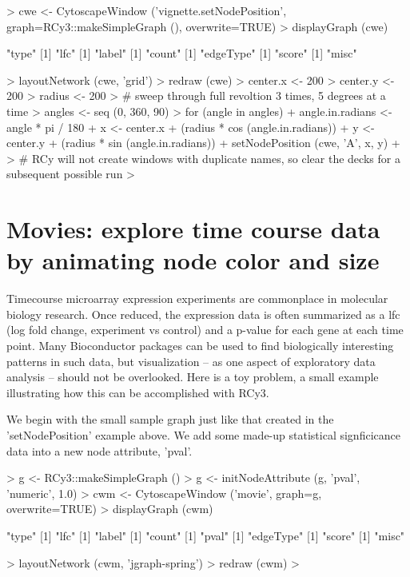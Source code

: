 \documentclass[12pt]{article}
\begin{document}
\begin{Schunk}
\begin{Sinput}
>   cwe <- CytoscapeWindow ('vignette.setNodePosition', graph=RCy3::makeSimpleGraph (), overwrite=TRUE)
>   displayGraph (cwe)
\end{Sinput}
\begin{Soutput}
[1] "type"
[1] "lfc"
[1] "label"
[1] "count"
[1] "edgeType"
[1] "score"
[1] "misc"
\end{Soutput}
\begin{Sinput}
>   layoutNetwork (cwe, 'grid')
>   redraw (cwe)
>   center.x <- 200
>   center.y <- 200
>   radius <- 200
>     # sweep through full revoltion 3 times, 5 degrees at a time
>   angles <- seq (0, 360, 90)
>   for (angle in angles) {
+     angle.in.radians <- angle * pi / 180
+     x <- center.x + (radius * cos (angle.in.radians))
+     y <- center.y + (radius * sin (angle.in.radians))
+     setNodePosition (cwe, 'A', x, y)
+     }
>     # RCy will not create windows with duplicate names, so clear the decks for a subsequent possible run
> 
\end{Sinput}
\end{Schunk}

\section{Movies:  explore time course data by animating node color and size}

Timecourse microarray expression experiments are commonplace in molecular biology research.  Once reduced, the expression data is often summarized as a lfc (log fold change, experiment vs control) and a p-value for each gene at each time point.  Many Bioconductor packages can be used to find biologically interesting patterns in such data, but visualization -- as one aspect of exploratory data analysis -- should not be overlooked.  Here is a toy problem, a small example illustrating how this can be accomplished with RCy3.

We begin with the small sample graph just like that created in the 'setNodePosition' example above.  We add some made-up statistical signficicance data into a new node attribute, 'pval'.

\begin{Schunk}
\begin{Sinput}
>   g <- RCy3::makeSimpleGraph ()
>   g <- initNodeAttribute (g, 'pval', 'numeric', 1.0)
>   cwm <- CytoscapeWindow ('movie', graph=g, overwrite=TRUE)
>   displayGraph (cwm)
\end{Sinput}
\begin{Soutput}
[1] "type"
[1] "lfc"
[1] "label"
[1] "count"
[1] "pval"
[1] "edgeType"
[1] "score"
[1] "misc"
\end{Soutput}
\begin{Sinput}
>   layoutNetwork (cwm, 'jgraph-spring')
>   redraw (cwm)
> 
\end{Sinput}
\end{Schunk}
\end{document}

